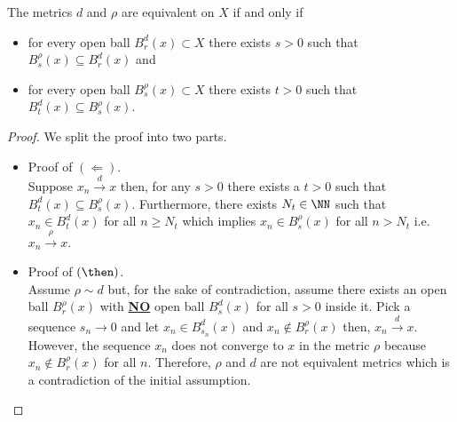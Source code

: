\documentclass[12pt, a4paper]{article}
\begin{document}
\begin{mdprop}
    The metrics \(d\) and \(\rho\) are equivalent on \(X\) if and only if 
    \begin{itemize}
        \item for every open ball \(B_r^d(x) \subset X\) there exists \(s>0\) such that \(B_s^{\rho}(x) \subseteq B_r^d(x)\) and 
        \item for every open ball \(B_s^{\rho}(x) \subset X\) there exists \(t>0\) such that \(B_t^d(x) \subseteq B_s^{\rho}(x)\).
    \end{itemize}
\end{mdprop}


\begin{proof}
    We split the proof into two parts.
    \begin{itemize}
        \item Proof of \((\Leftarrow)\). \\
        Suppose \(x_n \xrightarrow{d} x\) then, for any \(s>0\) there exists a \(t>0\) such that \(B_t^d(x) \subseteq B_s^{\rho}(x)\). Furthermore, there exists \(N_t \in \NN\) such that \(x_n \in B_t^d(x)\) for all \(n\geq N_t\) which implies \(x_n \in B_s^{\rho}(x)\) for all \(n>N_t\) i.e. \(x_n \xrightarrow{\rho} x\).
        \item Proof of \((\then)\). \\
        Assume \(\rho \sim d\) but, for the sake of contradiction, assume there exists an open ball \(B_r^{\rho}(x)\) with \underline{\textbf{NO}} open ball \(B_s^d(x)\) for all \(s>0\) inside it. Pick a sequence \(s_n \to 0\) and let \(x_n \in B_{s_n}^d(x)\) and \(x_n \not\in B_r^{\rho}(x)\) then, \(x_n \xrightarrow{d} x\). However, the sequence \(x_n\) does not converge to \(x\) in the metric \(\rho\) because \(x_n \not\in B_r^{\rho}(x)\) for all \(n\). Therefore, \(\rho\) and \(d\) are not equivalent metrics which is a contradiction of the initial assumption.
    \end{itemize}
\end{proof}
\end{document}
